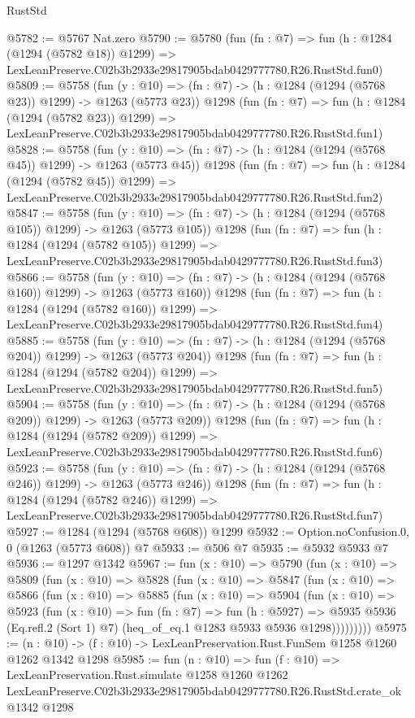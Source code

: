 \begin{lexlean}{RustStd}
\begin{coremodule}
@5782 := @5767 Nat.zero
@5790 := @5780
    (fun (fn : @7) =>
    fun (h : @1284 (@1294 (@5782 @18)) @1299) =>
    LexLeanPreserve.C02b3b2933e29817905bdab0429777780.R26.RustStd.fun0)
@5809 := @5758
    (fun (y : @10) => (fn : @7) -> (h : @1284 (@1294 (@5768 @23)) @1299) -> @1263 (@5773 @23))
    @1298
    (fun (fn : @7) =>
    fun (h : @1284 (@1294 (@5782 @23)) @1299) =>
    LexLeanPreserve.C02b3b2933e29817905bdab0429777780.R26.RustStd.fun1)
@5828 := @5758
    (fun (y : @10) => (fn : @7) -> (h : @1284 (@1294 (@5768 @45)) @1299) -> @1263 (@5773 @45))
    @1298
    (fun (fn : @7) =>
    fun (h : @1284 (@1294 (@5782 @45)) @1299) =>
    LexLeanPreserve.C02b3b2933e29817905bdab0429777780.R26.RustStd.fun2)
@5847 := @5758
    (fun (y : @10) => (fn : @7) -> (h : @1284 (@1294 (@5768 @105)) @1299) -> @1263 (@5773 @105))
    @1298
    (fun (fn : @7) =>
    fun (h : @1284 (@1294 (@5782 @105)) @1299) =>
    LexLeanPreserve.C02b3b2933e29817905bdab0429777780.R26.RustStd.fun3)
@5866 := @5758
    (fun (y : @10) => (fn : @7) -> (h : @1284 (@1294 (@5768 @160)) @1299) -> @1263 (@5773 @160))
    @1298
    (fun (fn : @7) =>
    fun (h : @1284 (@1294 (@5782 @160)) @1299) =>
    LexLeanPreserve.C02b3b2933e29817905bdab0429777780.R26.RustStd.fun4)
@5885 := @5758
    (fun (y : @10) => (fn : @7) -> (h : @1284 (@1294 (@5768 @204)) @1299) -> @1263 (@5773 @204))
    @1298
    (fun (fn : @7) =>
    fun (h : @1284 (@1294 (@5782 @204)) @1299) =>
    LexLeanPreserve.C02b3b2933e29817905bdab0429777780.R26.RustStd.fun5)
@5904 := @5758
    (fun (y : @10) => (fn : @7) -> (h : @1284 (@1294 (@5768 @209)) @1299) -> @1263 (@5773 @209))
    @1298
    (fun (fn : @7) =>
    fun (h : @1284 (@1294 (@5782 @209)) @1299) =>
    LexLeanPreserve.C02b3b2933e29817905bdab0429777780.R26.RustStd.fun6)
@5923 := @5758
    (fun (y : @10) => (fn : @7) -> (h : @1284 (@1294 (@5768 @246)) @1299) -> @1263 (@5773 @246))
    @1298
    (fun (fn : @7) =>
    fun (h : @1284 (@1294 (@5782 @246)) @1299) =>
    LexLeanPreserve.C02b3b2933e29817905bdab0429777780.R26.RustStd.fun7)
@5927 := @1284 (@1294 (@5768 @608)) @1299
@5932 := Option.noConfusion.{0, 0} (@1263 (@5773 @608)) @7
@5933 := @506 @7
@5935 := @5932 @5933 @7
@5936 := @1297 @1342
@5967 := fun (x : @10) =>
  @5790
    (fun (x : @10) =>
    @5809
      (fun (x : @10) =>
      @5828
        (fun (x : @10) =>
        @5847
          (fun (x : @10) =>
          @5866
            (fun (x : @10) =>
            @5885
              (fun (x : @10) =>
              @5904
                (fun (x : @10) =>
                @5923
                  (fun (x : @10) =>
                  fun (fn : @7) =>
                  fun (h : @5927) =>
                  @5935
                    @5936
                    (Eq.refl.{2} (Sort 1) @7)
                    (heq_of_eq.{1} @1283 @5933 @5936 @1298)))))))))
@5975 := (n : @10) -> (f : @10) -> LexLeanPreservation.Rust.FunSem @1258 @1260 @1262 @1342 @1298
@5985 := fun (n : @10) =>
  fun (f : @10) =>
  LexLeanPreservation.Rust.simulate
    @1258
    @1260
    @1262
    LexLeanPreserve.C02b3b2933e29817905bdab0429777780.R26.RustStd.crate_ok
    @1342
    @1298
\end{coremodule}
\end{lexlean}
